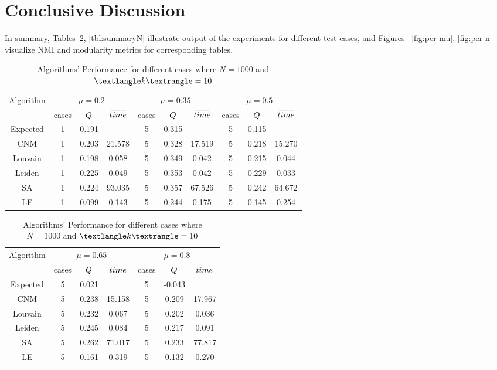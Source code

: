 \documentclass[11pt,a4paper]{article}
\newcommand{\overbar}[1]{\mkern 1.5mu\overline{\mkern-1.5mu#1\mkern-1.5mu}\mkern 1.5mu}
\begin{document}
\section{Conclusive Discussion}
In summary, Tables~\ref{tbl:summaryMU}, \ref{tbl:summaryN} illustrate output of the experiments for different test cases, and Figures~
\ref{fig:per-mu}, \ref{fig:per-n} visualize NMI and modularity metrics for corresponding tables.

\begin{table}[t]
	\centering
	\caption{Algorithms' Performance for different cases where $N = 1000$ and $\textlangle k \textrangle = 10$}\label{tbl:summaryMU}
	\begin{tabular}{c|ccc|ccc|ccc}
		\multirow{2}{*}{Algorithm}&\multicolumn{3}{c|}{$\mu = 0.2$}&\multicolumn{3}{c|}{$\mu = 0.35$}&\multicolumn{3}{c}{$\mu = 0.5$}\\
		&cases&$\overbar{Q}$&$\overbar{time}$&cases&$\overbar{Q}$&$\overbar{time}$&cases&$\overbar{Q}$&$\overbar{time}$\\
		Expected&1&0.191&&5&0.315&&5&0.115&\\
		\midrule
		CNM&1&0.203&21.578&5&0.328&17.519&5&0.218&15.270\\
		Louvain&1&0.198&0.058&5&0.349&0.042&5&0.215&0.044\\
		Leiden&1&0.225&0.049&5&0.353&0.042&5&0.229&0.033\\
		SA&1&0.224&93.035&5&0.357&67.526&5&0.242&64.672\\
		LE&1&0.099&0.143&5&0.244&0.175&5&0.145&0.254\\
	\end{tabular}

	\begin{tabular}{c|ccc|ccc}
		\multirow{2}{*}{Algorithm}&\multicolumn{3}{c|}{$\mu = 0.65$}&\multicolumn{3}{c}{$\mu = 0.8$}\\
		&cases&$\overbar{Q}$&$\overbar{time}$&cases&$\overbar{Q}$&$\overbar{time}$\\
		Expected&5&0.021&&5&-0.043&\\
		\midrule
		CNM&5&0.238&15.158&5&0.209&17.967\\
		Louvain&5&0.232&0.067&5&0.202&0.036\\
		Leiden&5&0.245&0.084&5&0.217&0.091\\
		SA&5&0.262&71.017&5&0.233&77.817\\
		LE&5&0.161&0.319&5&0.132&0.270\\
	\end{tabular}
\end{table} 
\end{document}
